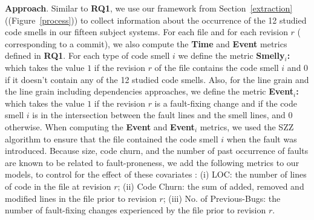 \textbf{Approach}. Similar to \textbf{RQ1}, we use our framework from Section~\ref{extraction} ({\color{blue}(Figure~\ref{process})}) to collect information about the occurrence of the 12 studied code smells in our {\color{blue}fifteen} subject systems. For each file and for each revision $r$ (\ie{} corresponding to a commit), we also compute the \textbf{Time} and \textbf{Event} metrics defined in \textbf{RQ1}. For each type of code smell $i$ we define the metric \textbf{Smelly$_{i}$:} which takes the value $1$ if the revision $r$ of the file contains the code smell $i$ and $0$ if it doesn't contain any of the 12 studied code smells. {\color{blue}Also, for the line grain and the line grain including dependencies approaches, we define the metric \textbf{Event$_{i}$:} which takes the value $1$ if the revision $r$ is a fault-fixing change and if the code smell $i$ is in the intersection between the fault lines and the smell lines, and $0$ otherwise.} When computing the \textbf{Event} {\color{blue}and \textbf{Event$_{i}$} metrics}, we used the SZZ algorithm to ensure that the file contained the code smell $i$ when the fault was introduced. %
Because size, code churn, and the number of past occurrence of faults are known to be related to fault-proneness, we add the following metrics to our models, to control for the effect of these covariates : (i) LOC: the number of lines of code in the file at revision $r$; (ii) Code Churn: the sum of added, removed and modified lines in the file prior to revision $r$; (iii) No. of Previous-Bugs: the number of fault-fixing changes experienced by the file prior to revision $r$.
%
%
%
%
